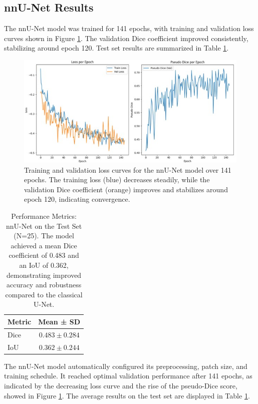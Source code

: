 \documentclass[12pt]{article}
\begin{document}
\subsection{nnU-Net Results} \label{subsec:nnu-net}  

The nnU-Net model was trained for 141 epochs, with training and validation loss curves shown in Figure \ref{fig:nnu-net_loss_curve}. The validation Dice coefficient improved consistently, stabilizing around epoch 120. Test set results are summarized in Table \ref{tab:nnunet_metrics}.

\begin{figure}[tp]
    \centering
    \includegraphics[width=\textwidth]{figures/Figure 3.jpg}
    \caption{Training and validation loss curves for the nnU-Net model over 141 epochs. The training loss (blue) decreases steadily, while the validation Dice coefficient (orange) improves and stabilizes around epoch 120, indicating convergence.}
    \label{fig:nnu-net_loss_curve}
\end{figure}

\begin{table}[tp]
\centering
\begin{tabular}{lc}
\toprule
\textbf{Metric} & \textbf{Mean ± SD} \\
\midrule
Dice & $0.483 \pm 0.284$ \\
IoU & $0.362 \pm 0.244$ \\
\bottomrule
\end{tabular}
\caption{Performance Metrics: nnU-Net on the Test Set (N=25). The model achieved a mean Dice coefficient of 0.483 and an IoU of 0.362, demonstrating improved accuracy and robustness compared to the classical U-Net.}
\label{tab:nnunet_metrics}
\end{table}

The nnU-Net model automatically configured its preprocessing, patch size, and training schedule. It reached optimal validation performance after 141 epochs, as indicated by the decreasing loss curve and the rise of the pseudo-Dice score, showed in Figure \ref{fig:nnu-net_loss_curve}. The average results on the test set are displayed in Table \ref{tab:nnunet_metrics}.
\end{document}
